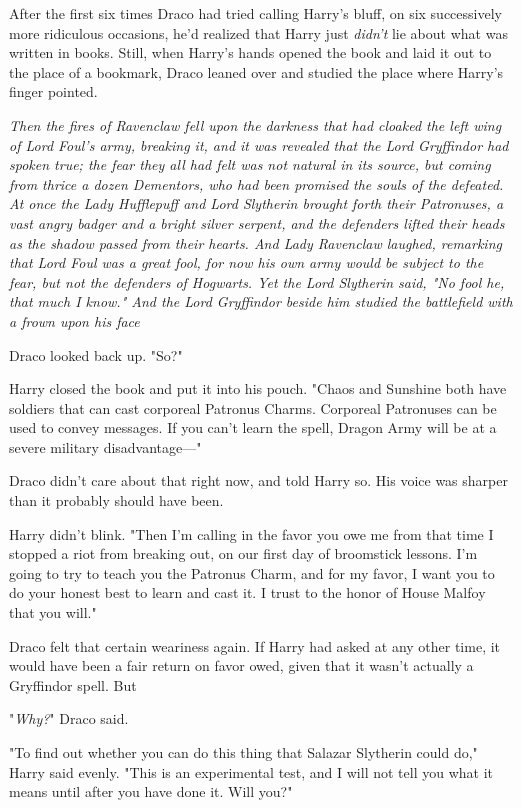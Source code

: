 After the first six times Draco had tried calling Harry's bluff, on six
successively more ridiculous occasions, he'd realized that Harry just
\emph{didn't} lie about what was written in books. Still, when Harry's hands
opened the book and laid it out to the place of a bookmark, Draco leaned over
and studied the place where Harry's finger pointed.

\emph{Then the fires of Ravenclaw fell upon the darkness that had cloaked the
left wing of Lord Foul's army, breaking it, and it was revealed that the Lord
Gryffindor had spoken true; the fear they all had felt was not natural in its
source, but coming from thrice a dozen Dementors, who had been promised the
souls of the defeated. At once the Lady Hufflepuff and Lord Slytherin brought
forth their Patronuses, a vast angry badger and a bright silver serpent, and
the defenders lifted their heads as the shadow passed from their hearts. And
Lady Ravenclaw laughed, remarking that Lord Foul was a great fool, for now his
own army would be subject to the fear, but not the defenders of Hogwarts. Yet
the Lord Slytherin said, "No fool he, that much I know." And the Lord
Gryffindor beside him studied the battlefield with a frown upon his
face{\el}}

Draco looked back up. "So?"

Harry closed the book and put it into his pouch. "Chaos and Sunshine both have
soldiers that can cast corporeal Patronus Charms. Corporeal Patronuses can be
used to convey messages. If you can't learn the spell, Dragon Army will be at a
severe military disadvantage\mbox{---}"

Draco didn't care about that right now, and told Harry so. His voice was
sharper than it probably should have been.

Harry didn't blink. "Then I'm calling in the favor you owe me from that time I
stopped a riot from breaking out, on our first day of broomstick lessons. I'm
going to try to teach you the Patronus Charm, and for my favor, I want you to
do your honest best to learn and cast it. I trust to the honor of House Malfoy
that you will."

Draco felt that certain weariness again. If Harry had asked at any other time,
it would have been a fair return on favor owed, given that it wasn't actually a
Gryffindor spell. But{\el}

"\emph{Why?}" Draco said.

"To find out whether you can do this thing that Salazar Slytherin could do,"
Harry said evenly. "This is an experimental test, and I will not tell you what
it means until after you have done it. Will you?"

